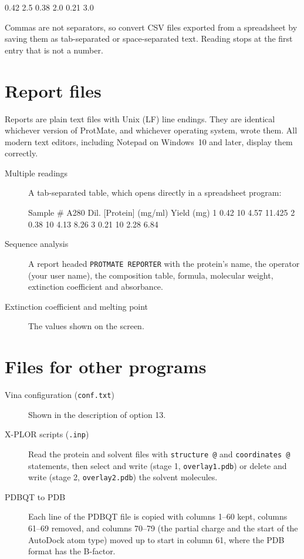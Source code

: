 \documentclass[11pt,a4paper,oneside]{report}
\newcommand{\cmd}[1]{\texttt{#1}}            %
\begin{document}
\begin{listing}
0.42 2.5
0.38 2.0
0.21 3.0
\end{listing}

Commas are not separators, so convert CSV files exported from a spreadsheet by saving them as
tab-separated or space-separated text. Reading stops at the first entry that is not a number.

\section{Report files}\label{sec:reports}

Reports are plain text files with Unix (LF) line endings. They are identical whichever version of
ProtMate, and whichever operating system, wrote them. All modern text editors, including Notepad on
Windows~10 and later, display them correctly.

\begin{description}
  \item[Multiple readings] A tab-separated table, which opens directly in a spreadsheet program:
\begin{listing}
Sample #        A280    Dil.    [Protein] (mg/ml)       Yield (mg)
1       0.42    10      4.57    11.425
2       0.38    10      4.13    8.26
3       0.21    10      2.28    6.84
\end{listing}
  \item[Sequence analysis] A report headed \cmd{PROTMATE REPORTER} with the protein's name, the
        operator (your user name), the composition table, formula, molecular weight, extinction
        coefficient and absorbance.
  \item[Extinction coefficient and melting point] The values shown on the screen.
\end{description}

\section{Files for other programs}

\begin{description}
  \item[Vina configuration (\cmd{conf.txt})] Shown in the description of option 13.
  \item[X-PLOR scripts (\cmd{.inp})] Read the protein and solvent files with \cmd{structure @} and
        \cmd{coordinates @} statements, then select and write (stage 1, \cmd{overlay1.pdb}) or
        delete and write (stage 2, \cmd{overlay2.pdb}) the solvent molecules.
  \item[PDBQT to PDB] Each line of the PDBQT file is copied with columns 1--60 kept, columns 61--69
        removed, and columns 70--79 (the partial charge and the start of the AutoDock atom type)
        moved up to start in column 61, where the PDB format has the B-factor.
\end{description}
\end{document}

